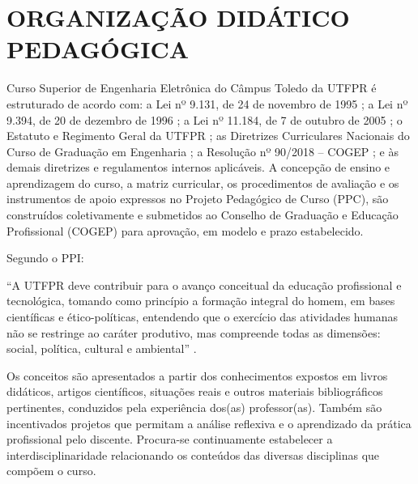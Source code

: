 \chapter{ORGANIZAÇÃO DIDÁTICO PEDAGÓGICA}

Curso Superior de Engenharia Eletrônica do Câmpus Toledo da UTFPR  é estruturado de acordo com: a Lei nº 9.131, de 24 de novembro de 1995 \cite{Lei:9131:1995}; a Lei nº 9.394, de 20 de dezembro de 1996 \cite{Lei:9394:1996}; a Lei nº 11.184, de 7 de outubro de 2005 \cite{Lei:11.184:2005}; o Estatuto e Regimento Geral da UTFPR \cite{estatutoutfpr}; as Diretrizes Curriculares Nacionais do Curso de Graduação em Engenharia \cite{dcneng}; a Resolução nº 90/2018 – COGEP \cite{cogep90}; e às demais diretrizes e regulamentos internos aplicáveis. A concepção de ensino e aprendizagem do curso, a matriz curricular, os procedimentos de avaliação e os instrumentos de apoio expressos no Projeto Pedagógico de Curso (PPC), são construídos coletivamente e submetidos ao Conselho de Graduação e Educação Profissional (COGEP) para aprovação, em modelo e prazo estabelecido.

Segundo o PPI:

\begin{citacao}
	``A  UTFPR  deve  contribuir  para  o  avanço  conceitual  da educação profissional e tecnológica, tomando como princípio a formação integral do homem,  em  bases  científicas  e  ético-políticas,  entendendo  que  o  exercício  das atividades humanas não se restringe ao caráter produtivo, mas compreende todas as dimensões: social, política, cultural e ambiental'' \cite{ppiutfpr}.
\end{citacao}



Os conceitos são apresentados a partir dos conhecimentos expostos em livros didáticos, artigos científicos, situações reais e outros materiais bibliográficos pertinentes, conduzidos pela experiência dos(as) professor(as). Também são incentivados projetos que permitam a análise reflexiva e o aprendizado da prática profissional pelo discente. Procura-se continuamente estabelecer a interdisciplinaridade relacionando os conteúdos das diversas disciplinas que compõem o curso.

